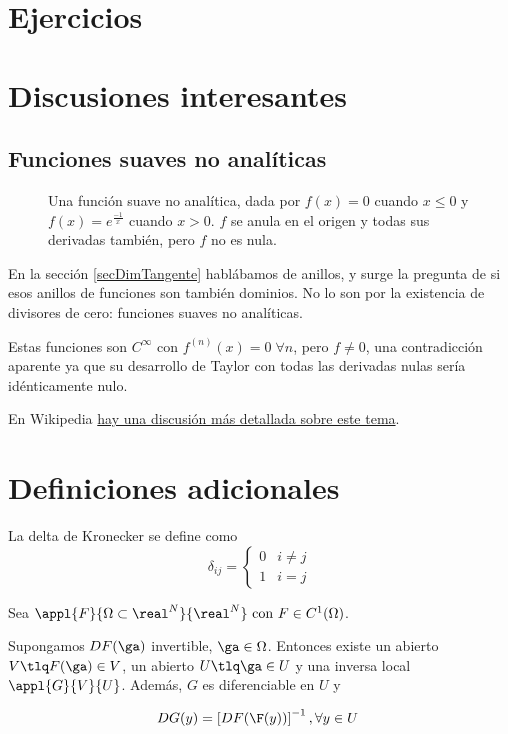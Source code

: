 \documentclass{apuntes}
\begin{document}
\chapter{Ejercicios}


\chapter{Discusiones interesantes}

\section{Funciones suaves no analíticas}

\begin{figure}[hbtp]
\centering
{}
\caption{Una función suave no analítica, dada por $f(x) = 0$ cuando $x ≤ 0$ y $f(x) = e^{\frac{-1}{x}}$ cuando $x > 0$. $f$ se anula en el origen y todas sus derivadas también, pero $f$ no es nula.}
\end{figure}

En la sección \ref{secDimTangente} hablábamos de anillos, y surge la pregunta de si esos anillos de funciones son también dominios. No lo son por la existencia de divisores de cero: funciones suaves no analíticas.

Estas funciones son $C^∞$ con $f^{(n)}(x) = 0\; ∀n$, pero $f ≠ 0$, una contradicción aparente ya que su desarrollo de Taylor con todas las derivadas nulas sería idénticamente nulo.

En Wikipedia \href{http://en.wikipedia.org/wiki/Non-analytic_smooth_function}{hay una discusión más detallada sobre este tema}.

\chapter{Definiciones adicionales}

\begin{defn} \label{defDeltaKronecker} La delta de Kronecker se define como \[ δ_{ij} = \begin{cases} 0 & i ≠ j \\ 1 & i = j \end{cases} \] \end{defn}

\begin{theorem}  \label{thmInv} Sea $\appl{F}{\Omega\subset\real^N}{\real^N} \text{ con } F\in C^1(\Omega)$.

Supongamos $DF(\ga)$ invertible, $\ga \in \Omega$. Entonces existe un abierto $V \tlq F(\ga)\in V$, un abierto $U \tlq \ga \in U$ y una inversa local $\appl{G}{V}{U}$. Además, $G$ es diferenciable en $U$ y

\[ DG(y) = \left[DF(\F(y))\right]^{-1}, \forall y \in U \]
\end{theorem}
\end{document}
